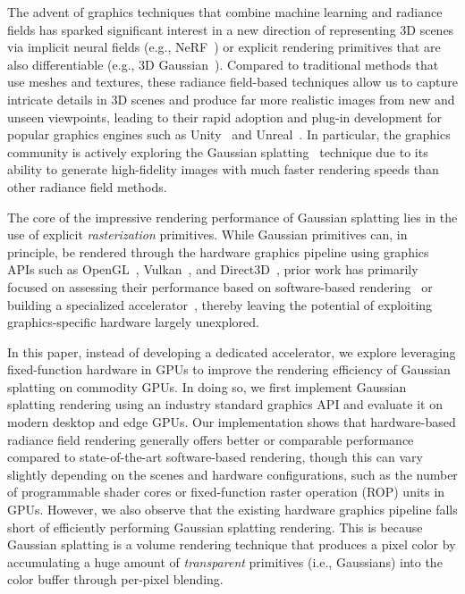 
The advent of graphics techniques that combine machine learning and radiance
fields has sparked significant interest in a new direction of representing 3D
scenes via implicit neural fields (e.g., NeRF~\cite{mil:sri20}) or explicit
rendering primitives that are also differentiable (e.g., 3D
Gaussian~\cite{ker:kop23}).
%
Compared to traditional methods that use meshes and textures, these radiance
field-based techniques allow us to capture intricate details in 3D scenes and
produce far more realistic images from new and unseen viewpoints, leading to
their rapid adoption and plug-in development for popular graphics engines such
as Unity~\cite{unity} and Unreal~\cite{unreal}.
%
In particular, the graphics community is actively exploring the Gaussian
splatting~\cite{ker:kop23} technique due to its ability to generate
high-fidelity images with much faster rendering speeds than other radiance
field methods.

The core of the impressive rendering performance of Gaussian splatting lies in
the use of explicit \emph{rasterization} primitives. While Gaussian primitives
can, in principle, be rendered through the hardware graphics pipeline using
graphics APIs such as OpenGL~\cite{opengl}, Vulkan~\cite{vulkan}, and
Direct3D~\cite{d3d}, prior work has primarily focused on assessing their
performance based on software-based rendering~\cite{ker:kop23,rad:ste24} or
building a specialized accelerator~\cite{lee:lee24}, thereby leaving the
potential of exploiting graphics-specific hardware largely unexplored.

In this paper, instead of developing a dedicated accelerator, we explore
leveraging fixed-function hardware in GPUs to improve the rendering efficiency
of Gaussian splatting on commodity GPUs.
%
In doing so, we first implement Gaussian splatting rendering using an industry
standard graphics API and evaluate it on modern desktop and edge GPUs.
%
Our implementation shows that hardware-based radiance field rendering generally
offers better or comparable performance compared to state-of-the-art
software-based rendering, though this can vary slightly depending on the scenes
and hardware configurations, such as the number of programmable shader cores or
fixed-function raster operation (ROP) units in GPUs. 
%
However, we also observe that the existing hardware graphics pipeline falls
short of efficiently performing Gaussian splatting rendering.
%
This is because Gaussian splatting is a volume rendering technique that
produces a pixel color by accumulating a huge amount of \emph{transparent}
primitives (i.e., Gaussians) into the color buffer through per-pixel
blending.

